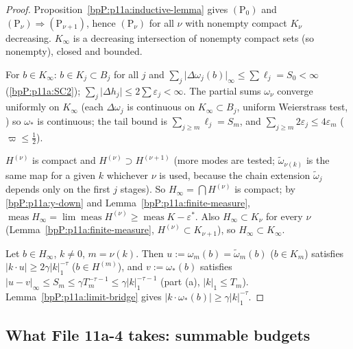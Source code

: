 \begin{proof}
\label{stepP:p11a:ps-iter} Proposition~\ref{bpP:p11a:inductive-lemma} gives $(\mathrm P_0)$ and $(\mathrm P_\nu)\Rightarrow(\mathrm P_{\nu+1})$, hence $(\mathrm P_\nu)$ for all $\nu$ with nonempty compact $K_\nu$ decreasing. $K_\infty$ is a decreasing intersection of nonempty compact sets (so nonempty), closed and bounded.

\label{stepP:p11a:ps-lim} For $b\in K_\infty$: $b\in K_j\subset B_j$ for all $j$ and $\sum_j\lvert\Delta\omega_j(b)\rvert_\infty\le\sum\ell_j=S_0<\infty$ (\ref{bpP:p11a:SC2}); $\sum_j\lvert\Delta h_j\rvert\le2\sum\varepsilon_j<\infty$. The partial sums $\omega_\nu$ converge uniformly on $K_\infty$ (each $\Delta\omega_j$ is continuous on $K_\infty\subset B_j$, uniform Weierstrass test, ) so $\omega_*$ is continuous; the tail bound is $\sum_{j\ge m}\ell_j=S_m$, and $\sum_{j\ge m}2\varepsilon_j\le4\varepsilon_m$ ($\varpi\le\frac12$).

\label{stepP:p11a:ps-H} $H^{(\nu)}$ is compact and $H^{(\nu)}\supset H^{(\nu+1)}$ (more modes are tested; $\tilde\omega_{\nu(k)}$ is the same map for a given $k$ whichever $\nu$ is used, because the chain extension $\tilde\omega_j$ depends only on the first $j$ stages). So $H_\infty=\bigcap H^{(\nu)}$ is compact; by \ref{bpP:p11a:y-down} and Lemma~\ref{bpP:p11a:finite-measure}, $\operatorname{meas}H_\infty=\lim\operatorname{meas}H^{(\nu)}\ge\operatorname{meas}K-\varepsilon^*$. Also $H_\infty\subset K_\nu$ for every $\nu$ (Lemma~\ref{bpP:p11a:finite-measure}, $H^{(\nu)}\subset K_{\nu+1}$), so $H_\infty\subset K_\infty$.

\label{stepP:p11a:ps-dio} Let $b\in H_\infty$, $k\ne0$, $m=\nu(k)$. Then $u:=\omega_m(b)=\tilde\omega_m(b)$ ($b\in K_m$) satisfies $\lvert k\cdot u\rvert\ge2\gamma\lvert k\rvert_1^{-\tau}$ ($b\in H^{(m)}$), and $v:=\omega_*(b)$ satisfies $\lvert u-v\rvert_\infty\le S_m\le\gamma T_m^{-\tau-1}\le\gamma\lvert k\rvert_1^{-\tau-1}$ (part (a), $\lvert k\rvert_1\le T_m$). Lemma~\ref{bpP:p11a:limit-bridge} gives $\lvert k\cdot\omega_*(b)\rvert\ge\gamma\lvert k\rvert_1^{-\tau}$.
\end{proof}

\subsection{What File 11a-4 takes: summable budgets}\label{bpP:p11a:sec-export}

